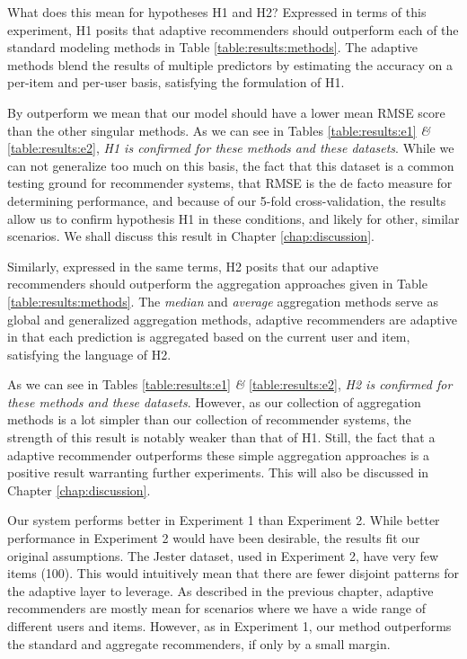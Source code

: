 What does this mean for hypotheses H1 and H2?
Expressed in terms of this experiment,
H1 posits that adaptive recommenders should outperform each of the standard modeling methods
in Table \ref{table:results:methods}.
The adaptive methods blend the results of multiple predictors by estimating the accuracy
on a per-item and per-user basis, satisfying the formulation of H1.

By outperform we mean that our model should have a lower
mean RMSE score than the other singular methods. As we can see in Tables \ref{table:results:e1} \emph{\&} \ref{table:results:e2},
\emph{H1 is confirmed for these methods and these datasets}.
While we can not generalize too much on this basis, 
the fact that this dataset is a common testing ground for recommender systems,
that RMSE is the de facto measure for determining performance,
and because of our 5-fold cross-validation, the results allow us 
to confirm hypothesis H1 in these conditions, and likely for other, similar scenarios.
We shall discuss this result in Chapter \ref{chap:discussion}.

Similarly, expressed in the same terms, H2 posits that 
our adaptive recommenders should outperform the aggregation approaches
given in Table \ref{table:results:methods}.
The \emph{median} and \emph{average} aggregation methods
serve as global and generalized aggregation methods,
adaptive recommenders are adaptive in that each prediction is 
aggregated based on the current user and item,
satisfying the language of H2.

As we can see in Tables \ref{table:results:e1} \emph{\&} \ref{table:results:e2},
\emph{H2 is confirmed for these methods and these datasets}.
However, as our collection of aggregation methods is a lot simpler
than our collection of recommender systems, the strength of this result
is notably weaker than that of H1.
Still, the fact that a adaptive recommender outperforms these simple aggregation
approaches is a positive result warranting further experiments.
This will also be discussed in Chapter \ref{chap:discussion}.

Our system performs better in Experiment 1 than Experiment 2.
While better performance in Experiment 2 would have been desirable,
the results fit our original assumptions.
The Jester dataset, used in Experiment 2, have very few items (100).
This would intuitively mean that there are fewer disjoint
patterns for the adaptive layer to leverage.
As described in the previous chapter, adaptive recommenders
are mostly mean for scenarios where we have a wide range of
different users and items.
However, as in Experiment 1, our method outperforms the standard and aggregate recommenders,
if only by a small margin.


